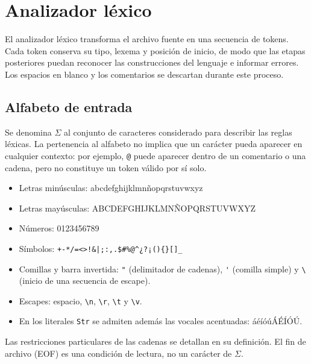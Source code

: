 \chapter{Analizador léxico}

El analizador léxico transforma el archivo fuente en una secuencia de tokens.
Cada token conserva su tipo, lexema y posición de inicio, de modo que las etapas
posteriores puedan reconocer las construcciones del lenguaje e informar errores.
Los espacios en blanco y los comentarios se descartan durante este proceso.


\section{Alfabeto de entrada}
Se denomina $\Sigma$ al conjunto de caracteres considerado para describir las
reglas léxicas. La pertenencia al alfabeto no implica que un carácter pueda
aparecer en cualquier contexto: por ejemplo, \verb~@~ puede aparecer dentro de
un comentario o una cadena, pero no constituye un token válido por sí solo.
\begin{itemize}[leftmargin=*]
  \item Letras minúsculas: abcdefghijklmnñopqrstuvwxyz
  \item Letras mayúsculas: ABCDEFGHIJKLMNÑOPQRSTUVWXYZ
  \item Números: 0123456789
  \item Símbolos: \verb~+-*/=<>!&|;:,.$#%@^¿?¡(){}[]_~
  \item Comillas y barra invertida: \verb~"~ (delimitador de cadenas),
        \verb~'~ (comilla simple) y \verb~\~ (inicio de una secuencia de escape).
  \item Escapes: espacio, \verb~\n~, \verb~\r~, \verb~\t~ y \verb~\v~.
  \item En los literales \texttt{Str} se admiten además las vocales acentuadas:
        áéíóúÁÉÍÓÚ.
\end{itemize}
Las restricciones particulares de las cadenas se detallan en su definición.
El fin de archivo (EOF) es una condición de lectura, no un carácter de $\Sigma$.


